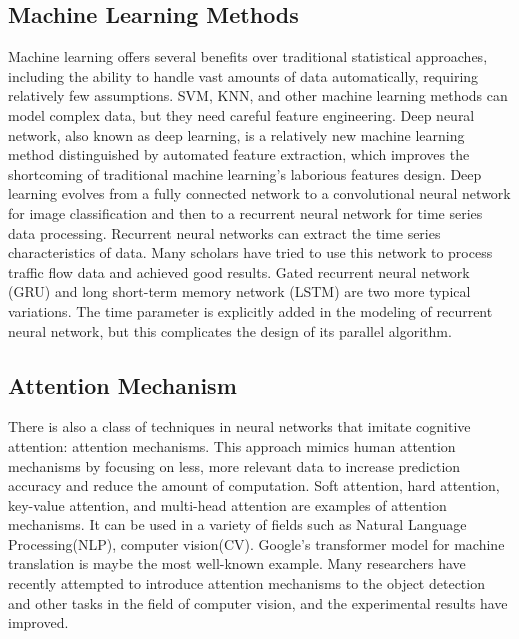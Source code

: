 \documentclass[conference]{IEEEtran}
\begin{document}
\subsection{Machine Learning Methods}
Machine learning offers several benefits over traditional statistical approaches, including the ability to handle vast amounts of data automatically, requiring relatively few assumptions. SVM, KNN, and other machine learning methods can model complex data, but they need careful feature engineering\cite{b8}. Deep neural network, also known as deep learning, is a relatively new machine learning method distinguished by automated feature extraction, which improves the shortcoming of traditional machine learning's laborious features design. Deep learning evolves from a fully connected network to a convolutional neural network for image classification and then to a recurrent neural network for time series data processing. Recurrent neural networks can extract the time series characteristics of data. Many scholars have tried to use this network to process traffic flow data and achieved good results. Gated recurrent neural network (GRU) and long short-term memory network (LSTM) are two more typical variations\cite{b9}. The time parameter is explicitly added in the modeling of recurrent neural network, but this complicates the design of its parallel algorithm\cite{}.

\subsection{Attention Mechanism}
There is also a class of techniques in neural networks that imitate cognitive attention: attention mechanisms. This approach mimics human attention mechanisms by focusing on less, more relevant data to increase prediction accuracy and reduce the amount of computation. Soft attention, hard attention, key-value attention, and multi-head attention are examples of attention mechanisms. It can be used in a variety of fields such as Natural Language Processing(NLP), computer vision(CV). Google's transformer model for machine translation is maybe the most well-known example\cite{b5}. Many researchers have recently attempted to introduce attention mechanisms to the object detection and other tasks in the field of computer vision, and the experimental results have improved.
\end{document}
